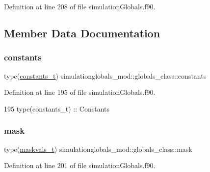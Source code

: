 Definition at line 208 of file simulation\+Globals.\+f90.



\subsection{Member Data Documentation}
\mbox{\label{structsimulationglobals__mod_1_1globals__class_ae5b1d2a8e662ad25456336893c91dd92}} 
\subsubsection{\texorpdfstring{constants}{constants}}
{\footnotesize\ttfamily type(\mbox{\hyperlink{structsimulationglobals__mod_1_1constants__t}{constants\+\_\+t}}) simulationglobals\+\_\+mod\+::globals\+\_\+class\+::constants\hspace{0.3cm}{\ttfamily [private]}}



Definition at line 195 of file simulation\+Globals.\+f90.


\begin{DoxyCode}
195         \textcolor{keywordtype}{type}(constants\_t)   :: Constants
\end{DoxyCode}
\mbox{\label{structsimulationglobals__mod_1_1globals__class_a09cf41d13d97a7a60935535e4a892ad5}} 
\subsubsection{\texorpdfstring{mask}{mask}}
{\footnotesize\ttfamily type(\mbox{\hyperlink{structsimulationglobals__mod_1_1maskvals__t}{maskvals\+\_\+t}}) simulationglobals\+\_\+mod\+::globals\+\_\+class\+::mask\hspace{0.3cm}{\ttfamily [private]}}



Definition at line 201 of file simulation\+Globals.\+f90.


